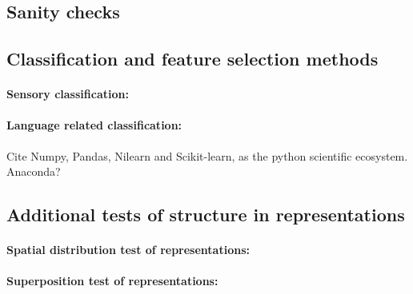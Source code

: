 \subsection{Sanity checks}




\subsection{Classification and feature selection methods}

\paragraph{Sensory classification:}


\paragraph{Language related classification:}


Cite Numpy, Pandas, Nilearn and Scikit-learn, as the python scientific ecosystem. Anaconda?


\subsection{Additional tests of structure in representations}

\paragraph{Spatial distribution test of representations:}

\paragraph{Superposition test of representations:}
